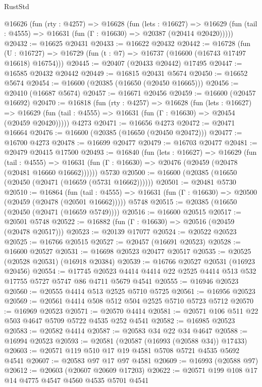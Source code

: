 \begin{lexlean}{RustStd}
\begin{coremodule}
  @16626
    (fun (rty : @4257) =>
    @16628
      (fun (lets : @16627) =>
      @16629 (fun (tail : @4555) => @16631 (fun (Γ : @16630) => @20387 (@20414 @20420)))))
@20432 := @16625 @20431
@20433 := @16622 @20432
@20442 := @16728
    (fun (U : @16727) => @16729 (fun (t : @7) => @16737 (@16600 (@16743 @17497 @16618) @16754)))
@20445 := @20407 (@20433 @20442) @17495
@20447 := @16585 @20432 @20442
@20449 := @16815 @20431 @5674
@20450 := @16652 @5674
@20454 := @16600 (@20385 (@16650 (@20450 @16665)))
@20456 := @20410 (@16687 @5674)
@20457 := @16671 @20456
@20459 := @16600 (@20457 @16692)
@20470 := @16818
    (fun (rty : @4257) =>
    @16628
      (fun (lets : @16627) =>
      @16629 (fun (tail : @4555) => @16631 (fun (Γ : @16630) => @20454 (@20459 @20420)))))
    @4273
@20471 := @16656 @4273
@20472 := @20471 @16664
@20476 := @16600 (@20385 (@16650 (@20450 @20472)))
@20477 := @16700 @4273
@20478 := @16699 @20477
@20479 := @16703 @20477
@20481 := @20479 @20415 @17500
@20493 := @16840
    (fun (lets : @16627) =>
    @16629
      (fun (tail : @4555) =>
      @16631 (fun (Γ : @16630) => @20476 (@20459 (@20478 (@20481 @16660 @16662))))))
    @5730
@20500 := @16600 (@20385 (@16650 (@20450 (@20471 (@16659 (@5731 @16662))))))
@20501 := @20481 @5730
@20510 := @16864
    (fun (tail : @4555) => @16631 (fun (Γ : @16630) => @20500 (@20459 (@20478 (@20501 @16662)))))
    @5748
@20515 := @20385 (@16650 (@20450 (@20471 (@16659 @5749))))
@20516 := @16600 @20515
@20517 := @20501 @5748
@20522 := @16882 (fun (Γ : @16630) => @20516 (@20459 (@20478 @20517)))
@20523 := @20139 @17077
@20524 := @20522 @20523
@20525 := @16766 @20515
@20527 := @20457 (@16691 @20523)
@20528 := @16600 @20527
@20531 := @16698 @20523 @20477 @20517
@20535 := @20525 (@20528 @20531) (@16918 @20384)
@20539 := @16766 @20527 @20531 (@16923 @20456)
@20554 := @17745
    @20523
    @4414
    @4414
    @22
    @2525
    @4414
    @513
    @532
    @17755
    @5727
    @5747
    @86
    @4711
    @5679
    @4541
@20555 := @16946 @20523
@20560 := @20555 @4414 @513 @2525 @5710 @5725
@20561 := @16956 @20523
@20569 := @20561 @4414 @508 @512 @504 @2525 @5710 @5723 @5712
@20570 := @16969 @20523
@20571 := @20570 @4414
@20581 := @20571 @106 @511 @22 @503 @4647 @5709 @5722 @4535 @252 @4541
@20582 := @16985 @20523
@20583 := @20582 @4414
@20587 := @20583 @34 @22 @34 @4647
@20588 := @16994 @20523
@20593 := @20581 (@20587 (@16993 (@20588 @34)) @17433)
@20603 := @20571 @119 @510 @17 @19 @4581 @5708 @5721 @4535 @5692 @4541
@20607 := @20583 @97 @17 @97 @4581
@20609 := @16993 (@20588 @97)
@20612 := @20603 (@20607 @20609 @17203)
@20622 := @20571 @199 @108 @17 @14 @4775 @4547 @4560 @4535 @5701 @4541

\end{coremodule}
\end{lexlean}
